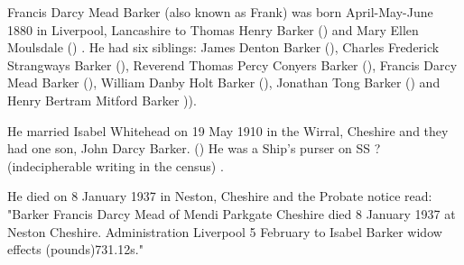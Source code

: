 
Francis Darcy Mead Barker (also known as Frank)  was born April-May-June 1880 in Liverpool, Lancashire to Thomas Henry Barker () and Mary Ellen Moulsdale ()  \cite{FBarkerBirth}. He had six siblings: James Denton Barker (), Charles Frederick Strangways Barker (), Reverend Thomas Percy Conyers Barker (), Francis Darcy Mead Barker (), William Danby Holt Barker (), Jonathan Tong Barker () and Henry Bertram Mitford Barker )).

He married Isabel Whitehead on 19 May 1910 in the Wirral, Cheshire \cite{FBarkerMarriage} and they had one son, John Darcy Barker. ()
He was a Ship's  purser on SS ? (indecipherable writing in the census) \cite{BarkerOccupation}.

He died on 8 January 1937 in	Neston, Cheshire \cite{FBarkerDeath} and the Probate notice read:
"Barker Francis Darcy Mead of Mendi Parkgate Cheshire died 8 January 1937 at Neston Cheshire. Administration Liverpool 5 February to Isabel Barker widow effects (pounds)731.12s."
